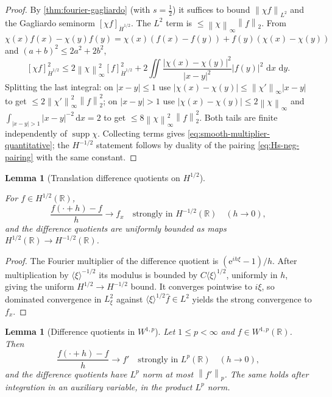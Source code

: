\documentclass[11pt,oneside]{book}
\providecommand{\uses}[1]{}
\newtheorem{lemma}[theorem]{Lemma}
\theoremstyle{definition}
\theoremstyle{remark}
\newcommand{\R}{\mathbb R}
\newcommand{\supp}{\operatorname{supp}}
\newcommand{\1}{\mathbf 1}
\newcommand{\dd}{\,\mathrm d}
\newcommand{\norm}[1]{\left\lVert #1\right\rVert}
\newcommand{\abs}[1]{\left\lvert #1\right\rvert}
\newcommand{\e}{\mathrm e}
\begin{document}
\begin{proof}
\uses{thm:fourier-gagliardo}
By \cref{thm:fourier-gagliardo} (with $s=\tfrac12$) it suffices to bound
$\norm{\chi f}_{L^2}$ and the Gagliardo seminorm $[\chi f]_{\dot H^{1/2}}$. The
$L^2$ term is $\le\norm{\chi}_\infty\norm{f}_2$. From
$\chi(x)f(x)-\chi(y)f(y)=\chi(x)(f(x)-f(y))+f(y)(\chi(x)-\chi(y))$ and
$(a+b)^2\le2a^2+2b^2$,
\[
 [\chi f]_{\dot H^{1/2}}^2
 \le 2\norm{\chi}_\infty^2[f]_{\dot H^{1/2}}^2
    +2\iint\frac{\abs{\chi(x)-\chi(y)}^2}{\abs{x-y}^{2}}\abs{f(y)}^2\,\dd x\,\dd y.
\]
Splitting the last integral: on $\abs{x-y}\le1$ use
$\abs{\chi(x)-\chi(y)}\le\norm{\chi'}_\infty\abs{x-y}$ to get
$\le2\norm{\chi'}_\infty^2\norm{f}_2^2$; on $\abs{x-y}>1$ use
$\abs{\chi(x)-\chi(y)}\le2\norm{\chi}_\infty$ and $\int_{\abs{x-y}>1}\abs{x-y}^{-2}\dd x=2$
to get $\le8\norm{\chi}_\infty^2\norm{f}_2^2$. Both tails are finite
independently of $\supp\chi$. Collecting terms gives
\eqref{eq:smooth-multiplier-quantitative}; the $H^{-1/2}$ statement follows by
duality of the pairing \eqref{eq:Hs-neg-pairing} with the same constant.
\end{proof}

\begin{lemma}[Translation difference quotients on $H^{1/2}$]\label{lem:translation-dq}
\uses{def:Hs-space}
For $f\in H^{1/2}(\R)$,
\[
 \frac{f(\cdot+h)-f}{h}\longrightarrow f_x
 \quad\text{strongly in }H^{-1/2}(\R)\quad(h\to0),
\]
and the difference quotients are uniformly bounded as maps
$H^{1/2}(\R)\to H^{-1/2}(\R)$.
\end{lemma}

\begin{proof}
The Fourier multiplier of the difference quotient is $(\e^{ih\xi}-1)/h$. After
multiplication by $\langle\xi\rangle^{-1/2}$ its modulus is bounded by
$C\langle\xi\rangle^{1/2}$, uniformly in $h$, giving the uniform
$H^{1/2}\to H^{-1/2}$ bound. It converges pointwise to $i\xi$, so dominated
convergence in $L^2_\xi$ against $\langle\xi\rangle^{1/2}\widehat f\in L^2$
yields the strong convergence to $f_x$.
\end{proof}

\begin{lemma}[Difference quotients in $W^{1,p}$]\label{lem:Wp-difference-quotient}
Let $1\le p<\infty$ and $f\in W^{1,p}(\R)$. Then
\begin{equation}
 \frac{f(\cdot+h)-f}{h}\longrightarrow f'
 \quad\text{strongly in }L^p(\R)\quad(h\to0),
 \label{eq:Wp-difference-quotient}
\end{equation}
and the difference quotients have $L^p$ norm at most $\norm{f'}_p$. The same
holds after integration in an auxiliary variable, in the product $L^p$ norm.
\end{lemma}
\end{document}
